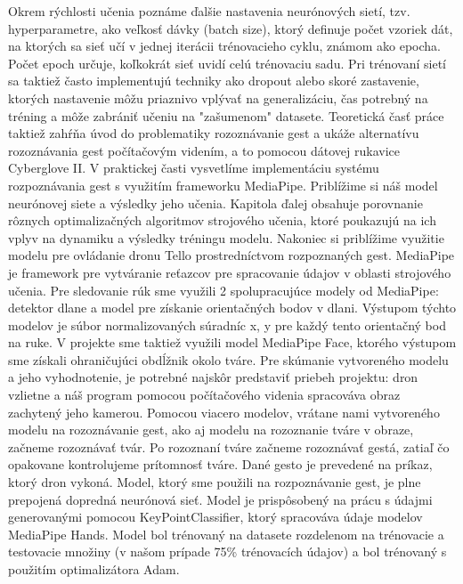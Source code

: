Okrem rýchlosti učenia poznáme ďalšie nastavenia neurónových sietí, tzv. hyperparametre, ako veľkosť dávky (batch size), ktorý definuje počet vzoriek dát, na ktorých sa sieť učí v jednej iterácii trénovacieho cyklu, známom ako epocha. Počet epoch určuje, koľkokrát sieť uvidí celú trénovaciu sadu.\newline
Pri trénovaní sietí sa taktiež často implementujú techniky ako dropout alebo skoré zastavenie, ktorých nastavenie môžu priaznivo vplývať na generalizáciu, čas potrebný na tréning a môže zabrániť učeniu na "zašumenom" datasete. \newline
Teoretická  časť  																																
práce taktiež zahŕňa úvod do problematiky rozoznávanie gest a ukáže alternatívu rozoznávania gest počítačovým videním, a to pomocou dátovej rukavice Cyberglove II. \newline
V praktickej časti vysvetlíme implementáciu systému rozpoznávania gest s využitím frameworku MediaPipe. Priblížime si náš model neurónovej siete a výsledky jeho učenia. Kapitola ďalej obsahuje porovnanie rôznych optimalizačných algoritmov strojového učenia, ktoré poukazujú na ich vplyv na dynamiku a výsledky tréningu modelu. Nakoniec si priblížime využitie modelu pre ovládanie dronu Tello prostredníctvom rozpoznaných gest.\newline
 MediaPipe je framework pre vytváranie reťazcov pre spracovanie údajov v oblasti strojového učenia. Pre sledovanie rúk sme využili 2 spolupracujúce modely od MediaPipe: detektor dlane a model pre získanie orientačných bodov v dlani. Výstupom týchto modelov je súbor normalizovaných súradníc x, y pre každý tento orientačný bod na ruke. V projekte sme taktiež využili model MediaPipe Face, ktorého výstupom sme získali ohraničujúci obdĺžnik okolo tváre.\newline
Pre skúmanie vytvoreného modelu a jeho vyhodnotenie, je potrebné najskôr predstaviť priebeh projektu: dron vzlietne a náš program pomocou počítačového videnia spracováva obraz zachytený jeho kamerou. Pomocou viacero modelov, vrátane nami vytvoreného modelu na rozoznávanie gest, ako aj modelu na rozoznanie tváre v obraze, začneme rozoznávať tvár. Po rozoznaní tváre začneme rozoznávať gestá, zatiaľ čo opakovane kontrolujeme prítomnosť tváre. Dané gesto je prevedené na príkaz, ktorý dron vykoná.\newline
Model, ktorý sme použili na rozpoznávanie gest, je plne prepojená dopredná neurónová sieť. Model je prispôsobený na prácu s údajmi generovanými pomocou KeyPointClassifier, ktorý spracováva údaje modelov MediaPipe Hands. Model bol trénovaný na datasete rozdelenom na trénovacie a testovacie množiny (v našom prípade 75\% trénovacích údajov) a bol trénovaný s použitím optimalizátora Adam. 
